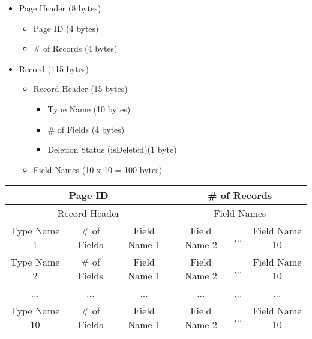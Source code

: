 \documentclass[12pt,a4paper]{article}
\begin{document}
        \begin{itemize}
          \item Page Header (8 bytes)
            \begin{itemize}
                 \item Page ID (4 bytes)
                 \item \# of Records (4 bytes)
            \end{itemize}
          \item Record (115 bytes)
            \begin{itemize}
                 \item Record Header (15 bytes)
                    \begin{itemize}
                        \item Type Name (10 bytes)
                        \item \# of Fields (4 bytes)
                        \item Deletion Status (isDeleted)(1 byte)
                    \end{itemize}
                 \item Field Names (10 x 10 = 100 bytes)
            \end{itemize}
        \end{itemize}

        \begin{table}[h!]
                \begin{center}
                    \begin{tabular}{ | c | c | c | c | c | c | }
                    \hline
                        \multicolumn{3}{||c|}{Page ID} &
                        \multicolumn{3}{|c||}{\# of Records} \\
                    \hline
                        \multicolumn{3}{||c|}{Record Header} &
                        \multicolumn{3}{|c||}{Field Names} \\
                    \hline
                    \hline
                    Type Name 1 & \# of Fields & Field Name 1 & Field Name 2 & ... & Field Name 10 \\
                    \hline
                    Type Name 2 & \# of Fields & Field Name 1 & Field Name 2 & ... & Field Name 10 \\
                    \hline
                    ... & ... & ... & ... & ... & ... \\
                    \hline
                    Type Name 10 & \# of Fields & Field Name 1 & Field Name 2 & ... & Field Name 10 \\
                    \hline
                    \end{tabular}
                \end{center}
           
        \end{table}
\end{document}
